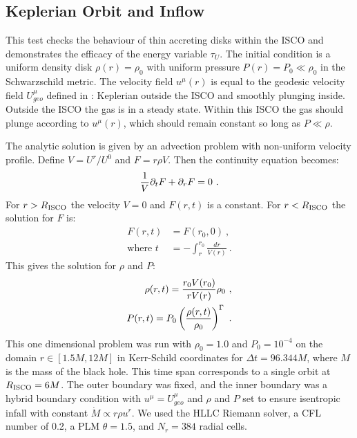 \subsection{Keplerian Orbit and Inflow}

This test checks the behaviour of thin accreting disks within the ISCO and demonstrates the efficacy of the energy variable $\tau_U$.  The initial condition is a uniform density disk $\rho(r)=\rho_0$ with uniform pressure $P(r) = P_0 \ll \rho_0$ in the Schwarzschild metric.  The velocity field $u^\mu(r)$ is equal to the geodesic velocity field $U^\mu_{geo}$ defined in : Keplerian outside the ISCO and smoothly plunging inside.  Outside the ISCO the gas is in a steady state.  Within this ISCO the gas should plunge according to $u^\mu(r)$, which should remain constant so long as $P \ll \rho$.

The analytic solution is given by an advection problem with non-uniform velocity profile.  Define $V = U^r / U^0$ and $F = r \rho V$. Then the continuity equation becomes:
\begin{equation}
	\frac{1}{V}\partial_t F + \partial_r F = 0\ . \eqlabel{kep:adveq}
\end{equation}
For $r > R_{\rm ISCO}$ the velocity $V=0$ and $F(r,t)$ is a constant.  For $r < R_{\rm ISCO}$ the solution for $F$ is:
\begin{align}
	F(r,t) &= F(r_0, 0)\ , \\
	\text{where } t &= -\int_r^{r_0} \frac{dr}{V(r)}\ .
\end{align}
This gives the solution for $\rho$ and $P$:
\begin{align}
	\rho(r,t) = \frac{r_0 V(r_0)}{r V(r)} \rho_0 \ , \\
	P(r,t) = P_0 \left(\frac{\rho(r,t)}{\rho_0}\right)^\Gamma\ .
\end{align}
This one dimensional problem was run with $\rho_0 = 1.0$ and $P_0 = 10^{-4}$ on the domain $r\in[1.5M, 12M]$ in Kerr-Schild coordinates for $\Delta t = 96.344M$, where $M$ is the mass of the black hole.  This time span corresponds to a single orbit at $R_{\rm ISCO} = 6M$.  The outer boundary was fixed, and the inner boundary was a hybrid boundary condition with $u^\mu = U^\mu_{geo}$ and $\rho$ and $P$ set to ensure isentropic infall with constant $\dot{M} \propto r\rho u^r$. We used the HLLC Riemann solver, a CFL number of 0.2, a PLM $\theta=1.5$, and $N_r = 384$ radial cells.

